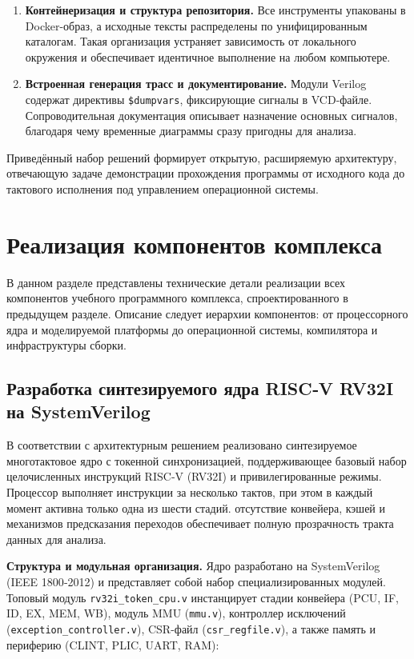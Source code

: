 \begin{enumerate}
  \item \textbf{Контейнеризация и структура репозитория.} Все инструменты упакованы в Docker-образ, а исходные тексты распределены по унифицированным каталогам. Такая организация устраняет зависимость от локального окружения и обеспечивает идентичное выполнение на любом компьютере.
  
  \item \textbf{Встроенная генерация трасс и документирование.} Модули Verilog содержат директивы \texttt{\$dumpvars}, фиксирующие сигналы в VCD-файле. Сопроводительная документация описывает назначение основных сигналов, благодаря чему временные диаграммы сразу пригодны для анализа.
\end{enumerate}

Приведённый набор решений формирует открытую, расширяемую архитектуру, отвечающую задаче демонстрации прохождения программы от исходного кода до тактового исполнения под управлением операционной системы.










\section{Реализация компонентов комплекса}

В данном разделе представлены технические детали реализации всех компонентов учебного программного комплекса, спроектированного в предыдущем разделе. Описание следует иерархии компонентов: от процессорного ядра и моделируемой платформы до операционной системы, компилятора и инфраструктуры сборки.

\subsection{Разработка синтезируемого ядра RISC‑V RV32I на SystemVerilog}

В соответствии с архитектурным решением реализовано синтезируемое многотактовое ядро с токенной синхронизацией, поддерживающее базовый набор целочисленных инструкций RISC‑V (RV32I) и привилегированные режимы. Процессор выполняет инструкции за несколько тактов, при этом в каждый момент активна только одна из шести стадий. отсутствие конвейера, кэшей и механизмов предсказания переходов обеспечивает полную прозрачность тракта данных для анализа.

\textbf{Структура и модульная организация.} Ядро разработано на SystemVerilog (IEEE 1800‑2012) и представляет собой набор специализированных модулей. Топовый модуль \texttt{rv32i\_token\_cpu.v} инстанцирует стадии конвейера (PCU, IF, ID, EX, MEM, WB), модуль MMU (\texttt{mmu.v}), контроллер исключений (\texttt{exception\_controller.v}), CSR-файл (\texttt{csr\_regfile.v}), а также память и периферию (CLINT, PLIC, UART, RAM):


